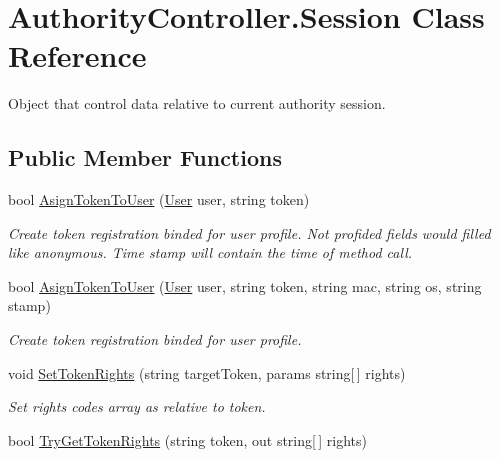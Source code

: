 \hypertarget{class_authority_controller_1_1_session}{}\section{Authority\+Controller.\+Session Class Reference}
\label{class_authority_controller_1_1_session}


Object that control data relative to current authority session.  


\subsection*{Public Member Functions}
\begin{DoxyCompactItemize}
\item 
bool \mbox{\hyperlink{class_authority_controller_1_1_session_a798dbdfeeb3ce9156d99d8b7962d9528}{Asign\+Token\+To\+User}} (\mbox{\hyperlink{class_authority_controller_1_1_data_1_1_personal_1_1_user}{User}} user, string token)
\begin{DoxyCompactList}\small\item\em Create token registration binded for user profile. Not profided fields would filled like anonymous. Time stamp will contain the time of method call. \end{DoxyCompactList}\item 
bool \mbox{\hyperlink{class_authority_controller_1_1_session_ab164831d0a5fc909c200feba1ac882e4}{Asign\+Token\+To\+User}} (\mbox{\hyperlink{class_authority_controller_1_1_data_1_1_personal_1_1_user}{User}} user, string token, string mac, string os, string stamp)
\begin{DoxyCompactList}\small\item\em Create token registration binded for user profile. \end{DoxyCompactList}\item 
void \mbox{\hyperlink{class_authority_controller_1_1_session_a135fc2981f8ad7d26d484c9c9bcbf83c}{Set\+Token\+Rights}} (string target\+Token, params string\mbox{[}$\,$\mbox{]} rights)
\begin{DoxyCompactList}\small\item\em Set rights\textquotesingle{} codes array as relative to token. \end{DoxyCompactList}\item 
bool \mbox{\hyperlink{class_authority_controller_1_1_session_a37157e74e3aee082b7adfb906ec69511}{Try\+Get\+Token\+Rights}} (string token, out string\mbox{[}$\,$\mbox{]} rights)

\end{DoxyCompactItemize}
